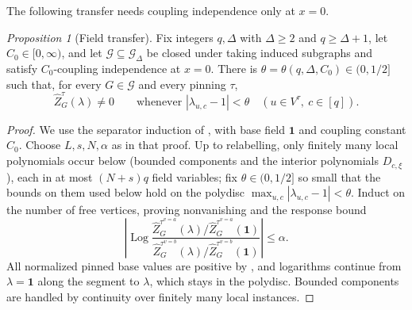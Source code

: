 \documentclass[11pt,reqno]{article}
\theoremstyle{plain}
\newtheorem{proposition}[theorem]{Proposition}
\theoremstyle{definition}
\theoremstyle{remark}
\newtheorem{proposition}[proposition]{Proposition}
\theoremstyle{definition}
\theoremstyle{remark}
\newcommand{\Log}{\operatorname{Log}}          %
\newcommand{\Deg}{\Delta}                        %
\newcommand{\colours}{[q]}                        %
\newcommand{\Gdeg}{\mathcal{G}_{\Deg}}
\newcommand{\nZpin}[2]{\widehat Z_{#1}^{#2}}
\begin{document}
The following transfer needs coupling independence only at \(x=0\).

\begin{proposition}[Field transfer]
\label{prop:field-transfer}
Fix integers \(q,\Deg\) with \(\Deg\ge2\) and \(q\ge\Deg+1\), let
\(C_0\in[0,\infty)\), and let \(\mathcal G\subseteq\Gdeg\) be closed
under taking induced subgraphs and satisfy \(C_0\)-coupling independence
at \(x=0\).  There is \(\theta=\theta(q,\Deg,C_0)\in(0,1/2]\) such that,
for every \(G\in\mathcal G\) and every pinning \(\tau\),
\[
  \nZpin{G}{\tau}(\lambda)\ne0
  \qquad\text{whenever }|\lambda_{u,c}-1|<\theta
  \quad(u\in V^\tau,\ c\in\colours).
\]
\end{proposition}

\begin{proof}
We use the separator induction of ,
with base field \(\mathbf1\) and coupling constant \(C_0\).  Choose
\(L,s,N,\alpha\) as in that proof.  Up to relabelling, only finitely
many local polynomials occur below (bounded components and the interior
polynomials \(D_{c,\xi}\)), each in at most \((N+s)q\) field variables;
fix \(\theta\in(0,1/2]\) so small that the bounds on them used below
hold on the polydisc \(\max_{u,c}|\lambda_{u,c}-1|<\theta\).  Induct on
the number of free vertices, proving nonvanishing and the response bound
\begin{equation}\label{eq:field-response}
  \left|\Log
  \frac{\nZpin{G}{\tau^{v=a}}(\lambda)/
        \nZpin{G}{\tau^{v=a}}(\mathbf1)}
       {\nZpin{G}{\tau^{v=b}}(\lambda)/
        \nZpin{G}{\tau^{v=b}}(\mathbf1)}\right|\le\alpha.
\end{equation}
All normalized pinned base values are positive by ,
and logarithms continue from \(\lambda=\mathbf1\) along the segment to
\(\lambda\), which stays in the polydisc.  Bounded components are handled
by continuity over finitely many local instances.


\end{proof}
\end{document}
